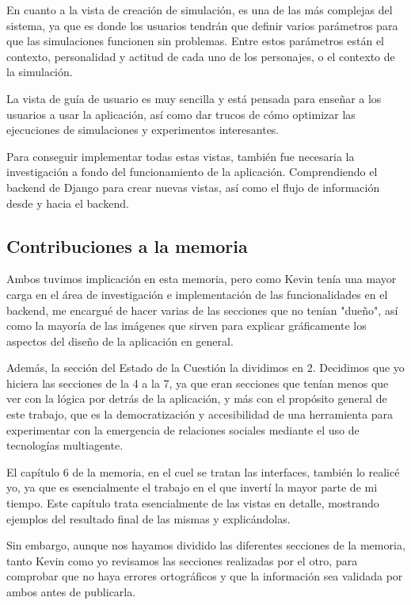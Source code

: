En cuanto a la vista de creación de simulación, es una de las más complejas del sistema, ya que es donde los usuarios tendrán que definir varios parámetros para que las simulaciones funcionen sin problemas. Entre estos parámetros están el contexto, personalidad y actitud de cada uno de los personajes, o el contexto de la simulación.

La vista de guía de usuario es muy sencilla y está pensada para enseñar a los usuarios a usar la aplicación, así como dar trucos de cómo optimizar las ejecuciones de simulaciones y experimentos interesantes.

Para conseguir implementar todas estas vistas, también fue necesaria la investigación a fondo del funcionamiento de la aplicación. Comprendiendo el backend de Django para crear nuevas vistas, así como el flujo de información desde y hacia el backend.

\subsection*{Contribuciones a la memoria}

Ambos tuvimos implicación en esta memoria, pero como Kevin tenía una mayor carga en el área de investigación e implementación de las funcionalidades en el backend, me encargué de hacer varias de las secciones que no tenían "dueño", así como la mayoría de las imágenes que sirven para explicar gráficamente los aspectos del diseño de la aplicación en general.

Además, la sección del Estado de la Cuestión la dividimos en 2. Decidimos que yo hiciera las secciones de la 4 a la 7, ya que eran secciones que tenían menos que ver con la lógica por detrás de la aplicación, y más con el propósito general de este trabajo, que es la democratización y accesibilidad de una herramienta para experimentar con la emergencia de relaciones sociales mediante el uso de tecnologías multiagente.

El capítulo 6 de la memoria, en el cuel se tratan las interfaces, también lo realicé yo, ya que es esencialmente el trabajo en el que invertí la mayor parte de mi tiempo. Este capítulo trata esencialmente de las vistas en detalle, mostrando ejemplos del resultado final de las mismas y explicándolas.

Sin embargo, aunque nos hayamos dividido las diferentes secciones de la memoria, tanto Kevin como yo revisamos las secciones realizadas por el otro, para comprobar que no haya errores ortográficos y que la información sea validada por ambos antes de publicarla.

